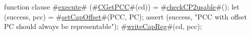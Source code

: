 function clause #\hyperref[zexecute]{execute}# (#\hyperref[zCGetPCC]{CGetPCC}#(cd)) =
{
  #\hyperref[zcheckCP2usable]{checkCP2usable}#();
  let (success, pcc) = #\hyperref[zsetCapOffset]{setCapOffset}#(PCC, PC);
  assert (success, "PCC with offset PC should always be representable");
  #\hyperref[zwriteCapReg]{writeCapReg}#(cd, pcc);
}
